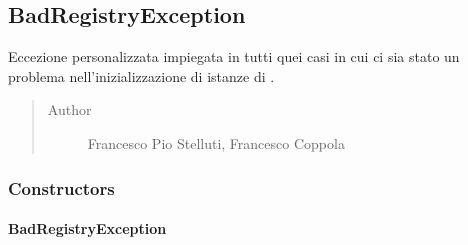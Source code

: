 \documentclass[letterpaper,10pt,italian,openany,oneside]{sphinxmanual}
\begin{document}
\label{\detokenize{test/it/unicam/cs/pa/mastermind/factories/package-index:package-it.unicam.cs.pa.mastermind.factories}}

\subsection{BadRegistryException}
\label{\detokenize{test/it/unicam/cs/pa/mastermind/factories/BadRegistryException:badregistryexception}}\label{\detokenize{test/it/unicam/cs/pa/mastermind/factories/BadRegistryException::doc}}

\begin{fulllineitems}
\label{\detokenize{test/it/unicam/cs/pa/mastermind/factories/BadRegistryException:it.unicam.cs.pa.mastermind.factories.BadRegistryException}}
Eccezione personalizzata impiegata in tutti quei casi in cui ci sia stato un problema nell’inizializzazione di istanze di .
\begin{quote}\begin{description}
\item[{Author}] \leavevmode
Francesco Pio Stelluti, Francesco Coppola

\end{description}\end{quote}

\end{fulllineitems}



\subsubsection{Constructors}
\label{\detokenize{test/it/unicam/cs/pa/mastermind/factories/BadRegistryException:constructors}}

\paragraph{BadRegistryException}
\label{\detokenize{test/it/unicam/cs/pa/mastermind/factories/BadRegistryException:id1}}
\end{document}
